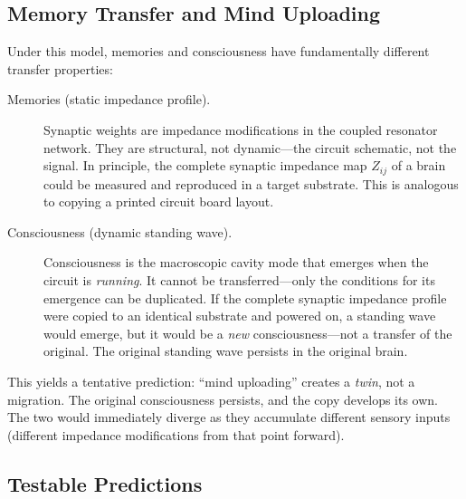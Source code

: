 \subsection{Memory Transfer and Mind Uploading}

Under this model, memories and consciousness have fundamentally
different transfer properties:

\begin{description}
  \item[Memories (static impedance profile).]
    Synaptic weights are impedance modifications in the coupled
    resonator network.  They are structural, not dynamic---the
    circuit schematic, not the signal.  In principle, the complete
    synaptic impedance map $Z_{ij}$ of a brain could be measured
    and reproduced in a target substrate.  This is analogous to
    copying a printed circuit board layout.

  \item[Consciousness (dynamic standing wave).]
    Consciousness is the macroscopic cavity mode that emerges when
    the circuit is \emph{running}.  It cannot be transferred---only
    the conditions for its emergence can be duplicated.  If the
    complete synaptic impedance profile were copied to an identical
    substrate and powered on, a standing wave would emerge, but it
    would be a \emph{new} consciousness---not a transfer of the
    original.  The original standing wave persists in the original
    brain.
\end{description}

This yields a tentative prediction: ``mind uploading'' creates a
\emph{twin}, not a migration.  The original consciousness
persists, and the copy develops its own.  The two would
immediately diverge as they accumulate different sensory inputs
(different impedance modifications from that point forward).

\subsection{Testable Predictions}

